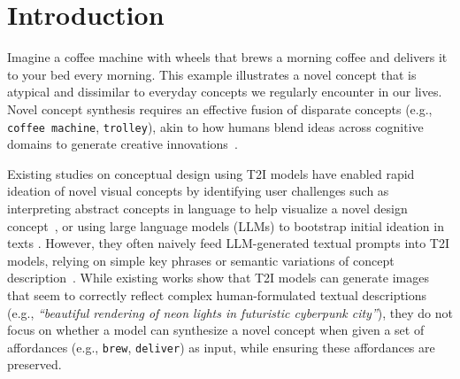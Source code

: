 
\section{Introduction}




Imagine a coffee machine with wheels that brews a morning coffee and delivers it to your bed every morning. This example illustrates a novel concept that is atypical and dissimilar to everyday concepts we regularly encounter in our lives. Novel concept synthesis requires an effective fusion of disparate concepts (e.g., \texttt{coffee machine}, \texttt{trolley}), akin to how humans blend ideas across cognitive domains to generate creative innovations~\cite{fauconnier2002wwt, Han2018THECD}. 



Existing studies on conceptual design using T2I models have enabled rapid ideation of novel visual concepts \citep{cai2023designaid, ma2023conceptual, wang2024inspired, lin2025inkspire} by identifying user challenges such as interpreting abstract concepts in language to help visualize a novel design concept~\citep{lin2025inkspire}, or using large language models (LLMs) to bootstrap initial ideation in texts \citep{cai2023designaid, zhu2023generative}. However, they often naively feed LLM-generated textual prompts into T2I models, relying on simple key phrases or semantic variations of concept description~\citep{cai2023designaid, wang2024inspired}. While existing works show that T2I models can generate images that seem to correctly reflect complex human-formulated textual descriptions (e.g., \textit{``beautiful rendering of neon lights in futuristic cyberpunk city''}), they do not focus on whether a model can synthesize a novel concept when given a set of affordances (e.g., \texttt{brew}, \texttt{deliver}) as input, while ensuring these affordances are preserved.

